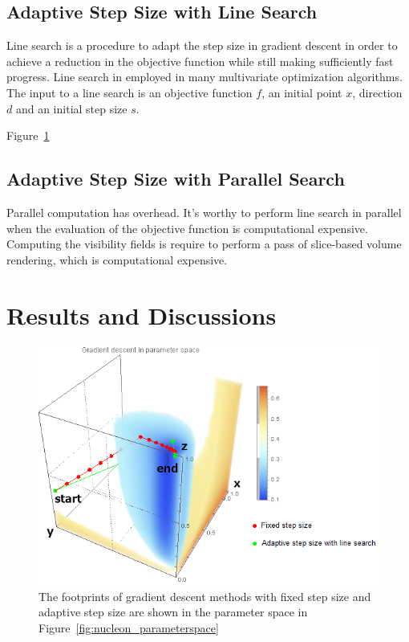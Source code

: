 \subsection{Adaptive Step Size with Line Search}
Line search is a procedure to adapt the step size in gradient descent in order to achieve a reduction in the objective function while still making sufficiently fast progress. Line search in employed in many multivariate optimization algorithms.
The input to a line search is an objective function $ f $, an initial point $ x $, direction $ d $ and an initial step size $ s $.

Figure~\ref{fig:nucleon_parameterspace_path}

\subsection{Adaptive Step Size with Parallel Search}
Parallel computation has overhead.
It's worthy to perform line search in parallel when the evaluation of the objective function is computational expensive.
Computing the visibility fields is require to perform a pass of slice-based volume rendering, which is computational expensive.

\section{Results and Discussions}

\begin{figure}
	\centering
	\begin{minipage}{.9\textwidth}
		\includegraphics[width=1\linewidth]{images/parameterspace_path}
	\end{minipage}
	\caption{The footprints of gradient descent methods with fixed step size and adaptive step size are shown in the parameter space in Figure~\ref{fig:nucleon_parameterspace}}
	\label{fig:nucleon_parameterspace_path}
\end{figure}

